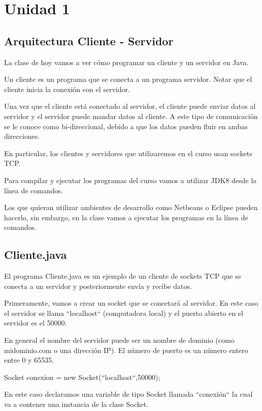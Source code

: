 \part{Unidad 1}

\chapter{Arquitectura Cliente - Servidor}

La clase de hoy vamos a ver cómo programar un cliente y un servidor en Java.

Un cliente es un programa que se conecta a un programa servidor. Notar que el cliente inicia la conexión con el servidor.

Una vez que el cliente está conectado al servidor, el cliente puede enviar datos al servidor y el servidor puede mandar datos al cliente. A este tipo de comunicación se le conoce como bi-direccional, debido a que los datos pueden fluir en ambas direcciones.

En particular, los clientes y servidores que utilizaremos en el curso usan sockets TCP.

Para compilar y ejecutar los programas del curso vamos a utilizar JDK8 desde la línea de comandos.

Los que quieran utilizar ambientes de desarrollo como Netbeans o Eclipse pueden hacerlo, sin embargo, en la clase vamos a ejecutar los programas en la línea de comandos.

\chapter{Cliente.java}

El programa Cliente.java es un ejemplo de un cliente de sockets TCP que se conecta a un servidor y posteriormente envía y recibe datos.

Primeramente, vamos a crear un socket que se conectará al servidor. En este caso el servidor se llama ``localhost`` (computadora local) y el puerto abierto en el servidor es el 50000.

En general el nombre del servidor puede ser un nombre de dominio (como midominio.com o una dirección IP). El número de puerto es un número entero entre 0 y 65535.

Socket conexion = new Socket(``localhost``,50000);

En este caso declaramos una variable de tipo Socket llamada ``conexión`` la cual va a contener una instancia de la clase Socket.

